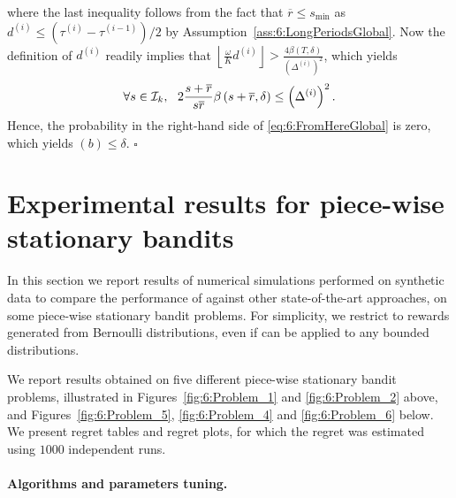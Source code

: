 %
where the last inequality follows from the fact that $\overline{r} \leq s_{\min}$ as $d^{(i)} \leq (\tau^{(i)} - \tau^{(i-1)})/2$ by Assumption~\ref{ass:6:LongPeriodsGlobal}. Now the definition of $d^{(i)}$ readily implies that
$\left\lfloor \frac{\omega}{K}d^{(i)}\right\rfloor > \frac{4\beta(T,\delta)}{\left(\Delta^{(i)}\right)^2}$,
which yields
\[\forall s \in \cI_k, \ \ 2\frac{s+\overline{r}}{s\overline{r}}\beta\left(s+\overline{r}, \delta\right) \leq \left(\Delta^{(i)}\right)^2.\]
%
Hence, the probability in the right-hand side of \eqref{eq:6:FromHereGlobal} is zero, which yields $(b) \leq \delta$.
%
\hfill{}$\square$





\section{Experimental results for piece-wise stationary bandits}
\label{sec:6:NumericalExperiments}

In this section we report results of numerical simulations performed on synthetic data to compare the performance of \GLRklUCB{} against other state-of-the-art approaches, on some piece-wise stationary bandit problems.
%
For simplicity, we restrict to rewards generated from Bernoulli distributions, even if \GLRklUCB{} can be applied to any bounded distributions.


We report results obtained on five different piece-wise stationary bandit problems, illustrated in Figures~\ref{fig:6:Problem_1} and \ref{fig:6:Problem_2} above, and Figures~\ref{fig:6:Problem_5}, \ref{fig:6:Problem_4} and \ref{fig:6:Problem_6} below.
We present regret tables and regret plots,
for which the regret was estimated using $1000$ independent runs.


\paragraph{Algorithms and parameters tuning.}
\label{sub:6:ParametersTuning}


